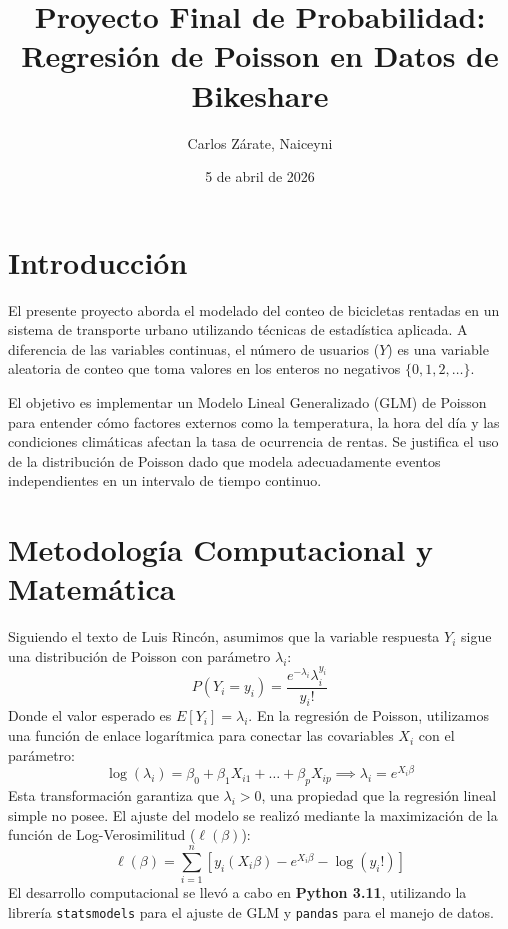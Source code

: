 \documentclass[12pt,a4paper]{article}
\title{Proyecto Final de Probabilidad: Regresión de Poisson en Datos de Bikeshare}
\author{Carlos Zárate, Naiceyni}
\date{5 de abril de 2026}
\begin{document}
\maketitle

\section{Introducción}
El presente proyecto aborda el modelado del conteo de bicicletas rentadas en un sistema de transporte urbano utilizando técnicas de estadística aplicada. A diferencia de las variables continuas, el número de usuarios ($Y$) es una variable aleatoria de conteo que toma valores en los enteros no negativos $\{0, 1, 2, \dots\}$. 

El objetivo es implementar un Modelo Lineal Generalizado (GLM) de Poisson para entender cómo factores externos como la temperatura, la hora del día y las condiciones climáticas afectan la tasa de ocurrencia de rentas. Se justifica el uso de la distribución de Poisson dado que modela adecuadamente eventos independientes en un intervalo de tiempo continuo.

\section{Metodología Computacional y Matemática}
Siguiendo el texto de Luis Rincón, asumimos que la variable respuesta $Y_i$ sigue una distribución de Poisson con parámetro $\lambda_i$:
\begin{equation}
P(Y_i = y_i) = \frac{e^{-\lambda_i} \lambda_i^{y_i}}{y_i!}
\end{equation}
Donde el valor esperado es $E[Y_i] = \lambda_i$. En la regresión de Poisson, utilizamos una función de enlace logarítmica para conectar las covariables $X_i$ con el parámetro:
\begin{equation}
\log(\lambda_i) = \beta_0 + \beta_1 X_{i1} + \dots + \beta_p X_{ip} \implies \lambda_i = e^{X_i \beta}
\end{equation}
Esta transformación garantiza que $\lambda_i > 0$, una propiedad que la regresión lineal simple no posee. El ajuste del modelo se realizó mediante la maximización de la función de Log-Verosimilitud ($\ell(\beta)$):
\begin{equation}
\ell(\beta) = \sum_{i=1}^{n} [y_i (X_i \beta) - e^{X_i \beta} - \log(y_i!)]
\end{equation}
El desarrollo computacional se llevó a cabo en \textbf{Python 3.11}, utilizando la librería \texttt{statsmodels} para el ajuste de GLM y \texttt{pandas} para el manejo de datos.
\end{document}
